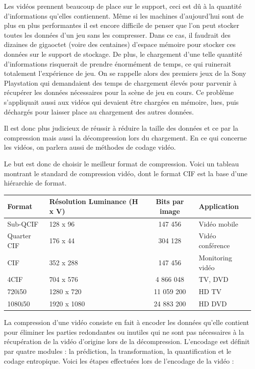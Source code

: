 \documentclass[a4paper, 11pt]{article} %
\begin{document}
Les vidéos prennent beaucoup de place sur le support, ceci est dû à la quantité d'informations qu'elles contiennent. Même si les machines d'aujourd'hui sont de plus en plus performantes il est encore difficile de penser que l'on peut stocker toutes les données d'un jeu sans les compresser. Dans ce cas, il faudrait des dizaines de gigaoctet (voire des centaines) d'espace mémoire pour stocker ces données sur le support de stockage. De plus, le chargement d'une telle quantité d'informations risquerait de prendre énormément de temps, ce qui ruinerait totalement l'expérience de jeu. On se rappelle alors des premiers jeux de la Sony Playstation qui demandaient des temps de chargement élevés pour parvenir à récupérer les données nécessaires pour la scène de jeu en cours. Ce problème s'appliquait aussi aux vidéos qui devaient être chargées en mémoire, lues, puis déchargés pour laisser place au chargement des autres données.

Il est donc plus judicieux de réussir à réduire la taille des données et ce par la compression mais aussi la décompression lors du chargement. En ce qui concerne les vidéos, on parlera aussi de méthodes de codage vidéo.

Le but est donc de choisir le meilleur format de compression. Voici un tableau montrant le standard de compression vidéo, dont le format CIF est la base d'une hiérarchie de format.

\begin{center}
	\begin{tabular}{|l|p{}|c|l|}
		\hline
		Format & Résolution Luminance (H x V) & Bits par image & Application\\
		\hline
		Sub-QCIF&128 x 96&147 456&Vidéo mobile\\
		Quarter CIF&176 x 44&304 128&Vidéo conférence\\
		CIF&352 x 288&147 456&Monitoring vidéo\\
		4CIF&704 x 576&4 866 048&TV, DVD\\
		720i50&1280 x 720&11 059 200&HD TV\\
		1080i50&1920 x 1080&24 883 200&HD DVD\\
		\hline
	\end{tabular}
\end{center}

La compression d'une vidéo consiste en fait à encoder les données qu'elle contient pour éliminer les parties redondantes ou inutiles qui ne sont pas nécessaires à la récupération de la vidéo d'origine lors de la décompression. L'encodage est définit par quatre modules : la prédiction, la transformation, la quantification et le codage entropique. Voici les étapes effectuées lors de l'encodage de la vidéo \cite{compression:video} :
\end{document}
